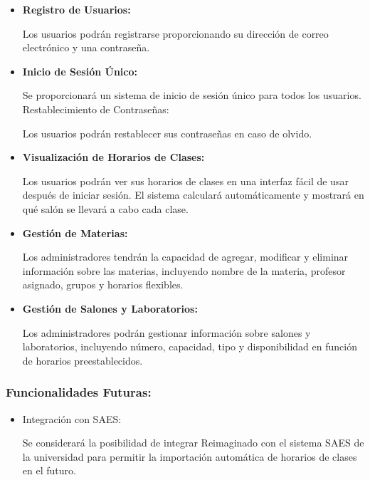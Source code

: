 \begin{itemize}

        \item {
              \textbf{Registro de Usuarios:}

              Los usuarios podrán registrarse proporcionando su dirección de correo electrónico y una contraseña.
              }

        \item {

              \textbf{Inicio de Sesión Único:}

              Se proporcionará un sistema de inicio de sesión único para todos los usuarios.
              Restablecimiento de Contraseñas:

              Los usuarios podrán restablecer sus contraseñas en caso de olvido.
              }

        \item {
              \textbf{Visualización de Horarios de Clases:}

              Los usuarios podrán ver sus horarios de clases en una interfaz fácil de usar después de iniciar sesión.
              El sistema calculará automáticamente y mostrará en qué salón se llevará a cabo cada clase.
              }

        \item {
              \textbf{Gestión de Materias:}

              Los administradores tendrán la capacidad de agregar, modificar y eliminar información sobre las materias, incluyendo nombre de la materia, profesor asignado, grupos y horarios flexibles.
              }

        \item {
              \textbf{Gestión de Salones y Laboratorios:}

              Los administradores podrán gestionar información sobre salones y laboratorios, incluyendo número, capacidad, tipo y disponibilidad en función de horarios preestablecidos.
              }

\end{itemize}

\subsubsection{Funcionalidades Futuras:}

\begin{itemize}
        \item {
              Integración con SAES:

              Se considerará la posibilidad de integrar Reimaginado con el sistema SAES de la universidad para permitir la importación automática de horarios de clases en el futuro.
              }
\end{itemize}

